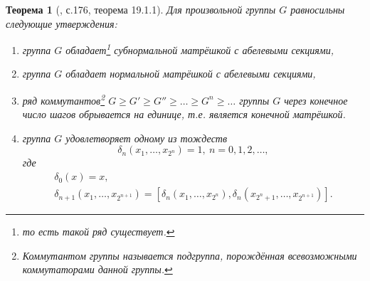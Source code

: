 \documentclass{article}
\newtheorem{theorem}{Теорема}[section]
\begin{document}
\begin{theorem}[\cite{kargapolov}, с.176, теорема 19.1.1] \label{fwuoe}
    Для произвольной группы $G$ равносильны следующие утверждения:
    \begin{enumerate}
        \item[а)] группа $G$ обладает\footnote{то есть такой ряд существует.} субнормальной матрёшкой с абелевыми секциями,
        \item[б)] группа $G$ обладает нормальной матрёшкой с абелевыми секциями,
        \item[в)] ряд коммутантов\footnote{\textit{Коммутантом} группы называется подгруппа, порождённая всевозможными коммутаторами данной группы.} $G \geqslant G' \geqslant G'' \geqslant \ldots \geqslant G^n \geqslant \ldots$ группы $G$ через конечное число шагов обрывается на единице, т.е. является конечной матрёшкой.
        \item[г)] группа $G$ удовлетворяет одному из тождеств $$ \delta_n(x_1, \ldots, x_{2^n}) = 1, \ n = 0, 1, 2, \ldots, $$
        где
        \begin{gather*}
            \delta_0(x) = x, \\
            \delta_{n + 1}(x_1, \ldots, x_{2^{n + 1}}) = [\delta_n(x_1, \ldots, x_{2^n}), \delta_n(x_{2^n + 1}, \ldots, x_{2^{n + 1}})].
        \end{gather*}
    \end{enumerate}
\end{theorem}
\end{document}
